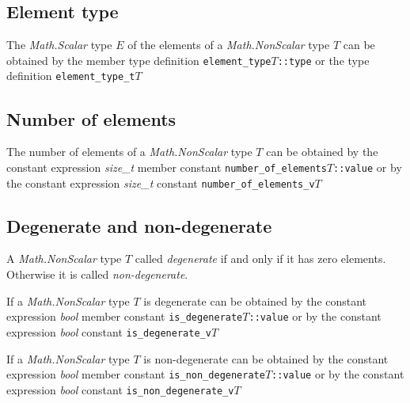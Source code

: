 \documentclass[oneside]{book}
\begin{document}
\subsection{Element type}
The \textit{Math.Scalar} type $E$ of the elements of a \textit{Math.NonScalar} type
$T$ can be obtained by the member type definition\newline
\texttt{element\_type\textlangle $T$\textrangle::type}\newline
or the type definition\newline
\texttt{element\_type\_t\textlangle$T$\textrangle}\newline

\subsection{Number of elements}
The number of elements of a \textit{Math.NonScalar} type $T$ can be obtained by
the constant expression \textit{size\_t} member constant\newline
\texttt{number\_of\_elements\textlangle $T$\textrangle::value}\newline
or by the constant expression \textit{size\_t} constant\newline
\texttt{number\_of\_elements\_v\textlangle $T$\textrangle}\newline

\subsection{Degenerate and non-degenerate}
A \textit{Math.NonScalar} type $T$ called \textit{degenerate} if and only if it has zero elements.
Otherwise it is called \textit{non-degenerate}.

If a \textit{Math.NonScalar} type $T$ is degenerate can be obtained by
the constant expression \textit{bool} member constant\newline
\texttt{is\_degenerate\textlangle $T$\textrangle::value}\newline
or by the constant expression \textit{bool} constant\newline
\texttt{is\_degenerate\_v\textlangle $T$\textrangle}\newline

If a \textit{Math.NonScalar} type $T$ is non-degenerate can be obtained by
the constant expression \textit{bool} member constant\newline
\texttt{is\_non\_degenerate\textlangle $T$\textrangle::value}\newline
or by the constant expression \textit{bool} constant\newline
\texttt{is\_non\_degenerate\_v\textlangle $T$\textrangle}\newline
\end{document}
